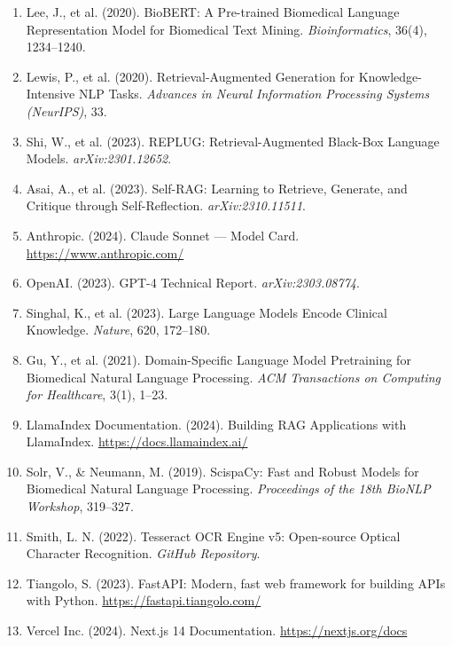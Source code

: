 \begin{enumerate}
    \item Lee, J., et al. (2020). BioBERT: A Pre-trained Biomedical Language Representation Model for Biomedical Text Mining. \textit{Bioinformatics}, 36(4), 1234--1240.
    \item Lewis, P., et al. (2020). Retrieval-Augmented Generation for Knowledge-Intensive NLP Tasks. \textit{Advances in Neural Information Processing Systems (NeurIPS)}, 33.
    \item Shi, W., et al. (2023). REPLUG: Retrieval-Augmented Black-Box Language Models. \textit{arXiv:2301.12652}.
    \item Asai, A., et al. (2023). Self-RAG: Learning to Retrieve, Generate, and Critique through Self-Reflection. \textit{arXiv:2310.11511}.
    \item Anthropic. (2024). Claude Sonnet --- Model Card. \url{https://www.anthropic.com/}
    \item OpenAI. (2023). GPT-4 Technical Report. \textit{arXiv:2303.08774}.
    \item Singhal, K., et al. (2023). Large Language Models Encode Clinical Knowledge. \textit{Nature}, 620, 172--180.
    \item Gu, Y., et al. (2021). Domain-Specific Language Model Pretraining for Biomedical Natural Language Processing. \textit{ACM Transactions on Computing for Healthcare}, 3(1), 1--23.
    \item LlamaIndex Documentation. (2024). Building RAG Applications with LlamaIndex. \url{https://docs.llamaindex.ai/}
    \item Solr, V., \& Neumann, M. (2019). ScispaCy: Fast and Robust Models for Biomedical Natural Language Processing. \textit{Proceedings of the 18th BioNLP Workshop}, 319--327.
    \item Smith, L. N. (2022). Tesseract OCR Engine v5: Open-source Optical Character Recognition. \textit{GitHub Repository}.
    \item Tiangolo, S. (2023). FastAPI: Modern, fast web framework for building APIs with Python. \url{https://fastapi.tiangolo.com/}
    \item Vercel Inc. (2024). Next.js 14 Documentation. \url{https://nextjs.org/docs}
\end{enumerate}

\clearpage
\appendix
{}
